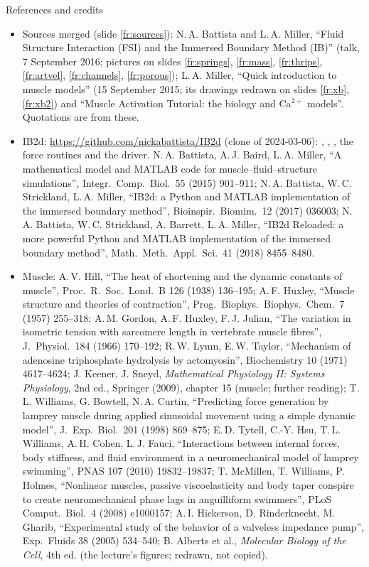 \documentclass[aspectratio=169,11pt]{beamer}
\begin{document}
\begin{frame}{References and credits}
\label{fr:refs}
\tiny
\begin{itemize}
  \item Sources merged (slide \ref{fr:sources}): N.\,A. Battista and L.\,A. Miller, ``Fluid Structure Interaction (FSI) and the Immersed Boundary Method (IB)'' (talk, 7 September 2016; pictures on slides \ref{fr:springs}, \ref{fr:mass}, \ref{fr:thrips}, \ref{fr:artvel}, \ref{fr:channels}, \ref{fr:porous}); L.\,A. Miller, ``Quick introduction to muscle models'' (15 September 2015; its drawings redrawn on slides \ref{fr:xb}, \ref{fr:xb2}) and ``Muscle Activation Tutorial: the biology and Ca$^{2+}$ models''. Quotations are from these.
  \item IB2d: \url{https://github.com/nickabattista/IB2d} (clone of 2024-03-06): , , , the force routines and the driver. N.\,A. Battista, A.\,J. Baird, L.\,A. Miller, ``A mathematical model and MATLAB code for muscle--fluid--structure simulations'', Integr.\ Comp.\ Biol.\ 55 (2015) 901--911; N.\,A. Battista, W.\,C. Strickland, L.\,A. Miller, ``IB2d: a Python and MATLAB implementation of the immersed boundary method'', Bioinspir.\ Biomim.\ 12 (2017) 036003; N.\,A. Battista, W.\,C. Strickland, A. Barrett, L.\,A. Miller, ``IB2d Reloaded: a more powerful Python and MATLAB implementation of the immersed boundary method'', Math.\ Meth.\ Appl.\ Sci.\ 41 (2018) 8455--8480.
  \item Muscle: A.\,V. Hill, ``The heat of shortening and the dynamic constants of muscle'', Proc.\ R.\ Soc.\ Lond.\ B 126 (1938) 136--195; A.\,F. Huxley, ``Muscle structure and theories of contraction'', Prog.\ Biophys.\ Biophys.\ Chem.\ 7 (1957) 255--318; A.\,M. Gordon, A.\,F. Huxley, F.\,J. Julian, ``The variation in isometric tension with sarcomere length in vertebrate muscle fibres'', J.\ Physiol.\ 184 (1966) 170--192; R.\,W. Lymn, E.\,W. Taylor, ``Mechanism of adenosine triphosphate hydrolysis by actomyosin'', Biochemistry 10 (1971) 4617--4624; J. Keener, J. Sneyd, \emph{Mathematical Physiology II: Systems Physiology}, 2nd ed., Springer (2009), chapter 15 (muscle; further reading); T.\,L. Williams, G. Bowtell, N.\,A. Curtin, ``Predicting force generation by lamprey muscle during applied sinusoidal movement using a simple dynamic model'', J.\ Exp.\ Biol.\ 201 (1998) 869--875; E.\,D. Tytell, C.-Y. Hsu, T.\,L. Williams, A.\,H. Cohen, L.\,J. Fauci, ``Interactions between internal forces, body stiffness, and fluid environment in a neuromechanical model of lamprey swimming'', PNAS 107 (2010) 19832--19837; T. McMillen, T. Williams, P. Holmes, ``Nonlinear muscles, passive viscoelasticity and body taper conspire to create neuromechanical phase lags in anguilliform swimmers'', PLoS Comput.\ Biol.\ 4 (2008) e1000157; A.\,I. Hickerson, D. Rinderknecht, M. Gharib, ``Experimental study of the behavior of a valveless impedance pump'', Exp.\ Fluids 38 (2005) 534--540; B. Alberts et al., \emph{Molecular Biology of the Cell}, 4th ed. (the lecture's figures; redrawn, not copied).

\end{itemize}
\end{frame}
\end{document}
